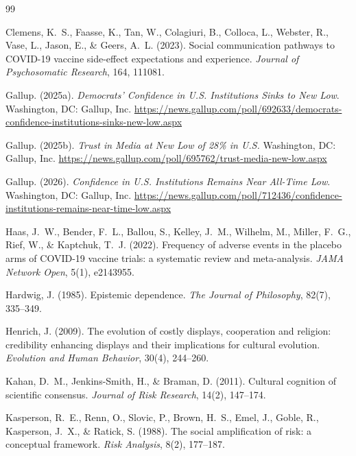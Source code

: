 \documentclass[11pt]{article}
\begin{document}

\begin{thebibliography}{99}

Clemens, K.~S., Faasse, K., Tan, W., Colagiuri, B., Colloca, L., Webster, R., Vase, L., Jason, E., \& Geers, A.~L. (2023). Social communication pathways to COVID-19 vaccine side-effect expectations and experience. \textit{Journal of Psychosomatic Research}, 164, 111081.

Gallup. (2025a). \textit{Democrats' Confidence in U.S. Institutions Sinks to New Low}. Washington, DC: Gallup, Inc. \url{https://news.gallup.com/poll/692633/democrats-confidence-institutions-sinks-new-low.aspx}

Gallup. (2025b). \textit{Trust in Media at New Low of 28\% in U.S.} Washington, DC: Gallup, Inc. \url{https://news.gallup.com/poll/695762/trust-media-new-low.aspx}

Gallup. (2026). \textit{Confidence in U.S. Institutions Remains Near All-Time Low}. Washington, DC: Gallup, Inc. \url{https://news.gallup.com/poll/712436/confidence-institutions-remains-near-time-low.aspx}

Haas, J.~W., Bender, F.~L., Ballou, S., Kelley, J.~M., Wilhelm, M., Miller, F.~G., Rief, W., \& Kaptchuk, T.~J. (2022). Frequency of adverse events in the placebo arms of COVID-19 vaccine trials: a systematic review and meta-analysis. \textit{JAMA Network Open}, 5(1), e2143955.

Hardwig, J. (1985). Epistemic dependence. \textit{The Journal of Philosophy}, 82(7), 335--349.

Henrich, J. (2009). The evolution of costly displays, cooperation and religion: credibility enhancing displays and their implications for cultural evolution. \textit{Evolution and Human Behavior}, 30(4), 244--260.

Kahan, D.~M., Jenkins-Smith, H., \& Braman, D. (2011). Cultural cognition of scientific consensus. \textit{Journal of Risk Research}, 14(2), 147--174.

Kasperson, R.~E., Renn, O., Slovic, P., Brown, H.~S., Emel, J., Goble, R., Kasperson, J.~X., \& Ratick, S. (1988). The social amplification of risk: a conceptual framework. \textit{Risk Analysis}, 8(2), 177--187.


\end{thebibliography}
\end{document}
